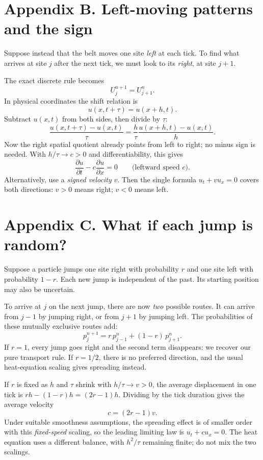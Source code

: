 \documentclass[11pt,a4paper]{article}
\newcommand{\ut}{\frac{\partial u}{\partial t}}
\newcommand{\ux}{\frac{\partial u}{\partial x}}
\begin{document}
\clearpage
\section*{Appendix B. Left-moving patterns and the sign}
Suppose instead that the belt moves one site \emph{left} at each tick. To find what arrives at site $j$ after the next tick, we must look to its \emph{right}, at site $j+1$.

The exact discrete rule becomes
\[
U_j^{n+1}=U_{j+1}^{n}.
\]
In physical coordinates the shift relation is
\[
u(x,t+\tau)=u(x+h,t).
\]
Subtract $u(x,t)$ from both sides, then divide by $\tau$:
\[
\frac{u(x,t+\tau)-u(x,t)}{\tau}
=\frac{h}{\tau}\frac{u(x+h,t)-u(x,t)}{h}.
\]
Now the right spatial quotient already points from left to right; no minus sign is needed. With $h/\tau\to c>0$ and differentiability, this gives
\[
\boxed{\ut-c\ux=0\qquad\text{(leftward speed }c\text{).}}
\]
Alternatively, use a \emph{signed velocity} $v$. Then the single formula $u_t+v u_x=0$ covers both directions: $v>0$ means right; $v<0$ means left.

\section*{Appendix C. What if each jump is random?}
Suppose a particle jumps one site right with probability $r$ and one site left with probability $1-r$. Each new jump is independent of the past. Its starting position may also be uncertain.

To arrive at $j$ on the next jump, there are now \emph{two} possible routes. It can arrive from $j-1$ by jumping right, or from $j+1$ by jumping left. The probabilities of these mutually exclusive routes add:
\[
\boxed{p_j^{n+1}=r\,p_{j-1}^{n}+(1-r)\,p_{j+1}^{n}.}
\]
If $r=1$, every jump goes right and the second term disappears: we recover our pure transport rule. If $r=1/2$, there is no preferred direction, and the usual heat-equation scaling gives spreading instead.

If $r$ is fixed as $h$ and $\tau$ shrink with $h/\tau\to v>0$, the average displacement in one tick is $rh-(1-r)h=(2r-1)h$. Dividing by the tick duration gives the average velocity
\[
\boxed{c=(2r-1)v.}
\]
Under suitable smoothness assumptions, the spreading effect is of smaller order with this \emph{fixed-speed} scaling, so the leading limiting law is $u_t+c u_x=0$. The heat equation uses a different balance, with $h^2/\tau$ remaining finite; do not mix the two scalings.

\clearpage
\end{document}

